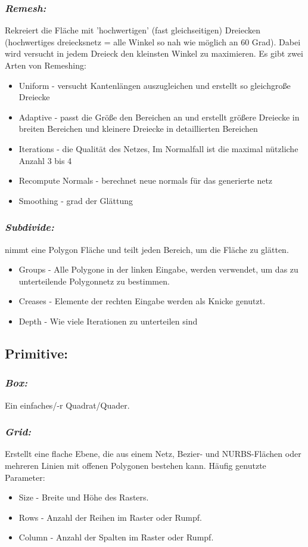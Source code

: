 \documentclass[paper=a4,fontsize=12pt,ngerman]{scrartcl}
\begin{document}
	\subsubsection*{\textit{Remesh:}}
	Rekreiert die Fläche mit 'hochwertigen' (fast gleichseitigen) Dreiecken (hochwertiges dreiecksnetz = alle Winkel so nah wie möglich an 60 Grad). Dabei wird versucht in jedem Dreieck den kleinsten Winkel zu maximieren.
	Es gibt zwei Arten von Remeshing:
	\begin{itemize}
		\item Uniform - versucht Kantenlängen auszugleichen und erstellt so gleichgroße Dreiecke
		\item Adaptive - passt die Größe den Bereichen an und erstellt größere Dreiecke in breiten Bereichen und kleinere Dreiecke in detaillierten Bereichen
	\end{itemize}
	\begin{itemize}
		\item Iterations - die Qualität des Netzes, Im Normalfall ist die maximal nützliche Anzahl 3 bis 4
		\item Recompute Normals - berechnet neue normals für das generierte netz
		\item Smoothing - grad der Glättung
	\end{itemize}
	
	\subsubsection*{\textit{Subdivide:}}
	nimmt eine Polygon Fläche und teilt jeden Bereich, um die Fläche zu glätten.
	\begin{itemize}
		\item Groups - Alle Polygone in der linken Eingabe, werden verwendet, um das zu unterteilende Polygonnetz zu bestimmen.
		\item Creases - Elemente der rechten Eingabe werden als Knicke genutzt.
		\item Depth - Wie viele Iterationen zu unterteilen sind
	\end{itemize}
	
	\subsection*{Primitive:}
	\subsubsection*{\textit{Box:}}
	Ein einfaches/-r Quadrat/Quader.
	\subsubsection*{\textit{Grid:}}
	Erstellt eine flache Ebene, die aus einem Netz, Bezier- und NURBS-Flächen oder mehreren Linien mit offenen Polygonen bestehen kann. Häufig genutzte Parameter:
		\begin{itemize}
			\item Size - Breite und Höhe des Rasters.
			\item Rows - Anzahl der Reihen im Raster oder Rumpf. 
			\item Column - Anzahl der Spalten im Raster oder Rumpf.
		\end{itemize}
\end{document}
